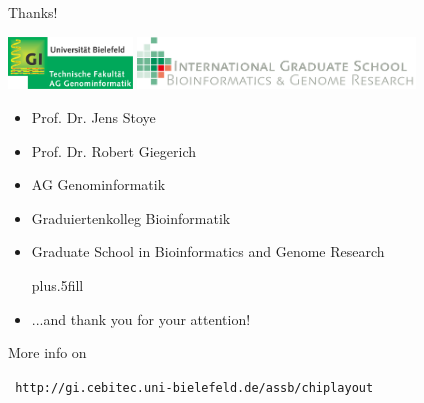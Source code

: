 \documentclass{beamer}
\begin{document}
\begin{frame}{Thanks!}

  \centerline{
    \includegraphics[height=1.4cm]{pics/aggi_logo.png}
    \hspace*{0.6cm}
    \includegraphics[height=1.4cm]{pics/gsbg_logo.png}
  }

  \begin{itemize}
    \item Prof. Dr. Jens Stoye
    \item Prof. Dr. Robert Giegerich
    \item AG Genominformatik
    \item Graduiertenkolleg Bioinformatik
    \item Graduate School in Bioinformatics and Genome Research
    
    \vskip0pt plus.5fill
    
    \item ...and \alert{thank you} for your attention!
    
  \end{itemize}
  
  \begin{block}{More info on}
    \centerline{\tt\alert{
      http://gi.cebitec.uni-bielefeld.de/assb/chiplayout
    }}
  \end{block}
  
\end{frame}
\end{document}
